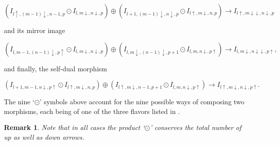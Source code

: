 \documentclass[11pt]{article}
\theoremstyle{plain}
\newtheorem{lemma}{Lemma}[section]
\theoremstyle{nonumberplain}
\theoremstyle{plain}
\newtheorem{remark}[lemma]{Remark}
\numberwithin{equation}{section}
\theoremstyle{nonumberplain}
\newtheorem{proof}{Proof}
\newcommand\1{{\bf 1}}
\newcommand{\alex}[1]{{\bf \color{green} **{#1}**}}
\begin{document}
\begin{equation}\label{eq:25}
  (I_{l\uparrow,(m-1)\downarrow,n-1,p}\odot I_{l,m\downarrow,n\downarrow,p})
  \oplus
  (I_{l+1,(m-1)\downarrow,n\downarrow,p}\odot I_{l\uparrow,m\downarrow,n,p})
  \to
  I_{l\uparrow,m\downarrow\downarrow,n\downarrow,p}
\end{equation}

and its mirror image 

\begin{equation}\label{eq:26}
  (I_{l,m-1,(n-1)\downarrow,p\uparrow}\odot I_{l,m\downarrow,n\downarrow,p})
  \oplus
  (I_{l,m\downarrow,(n-1)\downarrow,p+1}\odot I_{l,m,n\downarrow,p\uparrow})
  \to
  I_{l,m\downarrow,n\downarrow\downarrow,p\uparrow},
\end{equation}

and finally, the self-dual morphism

\begin{equation}\label{eq:27}
  (I_{l+1,m-1,n\downarrow,p\uparrow}\odot I_{l\uparrow,m\downarrow,n,p}
)  \oplus
  (I_{l\uparrow,m\downarrow,n-1,p+1}\odot I_{l,m,n\downarrow,p\uparrow})
  \to
  I_{l\uparrow,m\downarrow,n\downarrow,p\uparrow}.
\end{equation}


The nine `$\odot$' symbols above account for the nine possible ways of composing two morphisms, each being of one of the three flavors listed in . 

\begin{remark}
  Note that in all cases the product `$\odot$' conserves the total number of up as well as down arrows.
\end{remark}


\end{document}
